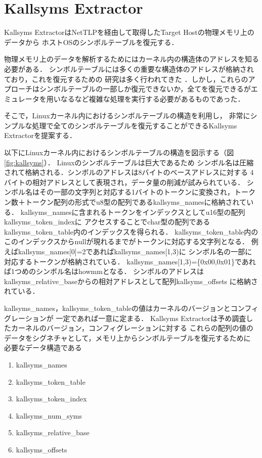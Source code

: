 \section{Kallsyms Extractor}


Kallsyms ExtractorはNetTLPを経由して取得したTarget Hostの物理メモリ上のデータから
ホストOSのシンボルテーブルを復元する．

物理メモリ上のデータを解析するためにはカーネル内の構造体のアドレスを知る必要がある．
シンボルテーブルには多くの重要な構造体のアドレスが格納されており，これを復元するための
研究は多く行われてきた\cite{ksfinder}\cite{volatility_android}
\cite{zhang2017research}\cite{autoprofile}．しかし，これらのアプローチはシンボルテーブルの一部しか復元できないか，全てを復元できるがエミュレータを用いなるなど複雑な処理を実行する必要があるものであった．

そこで，Linuxカーネル内におけるシンボルテーブルの構造を利用し，
非常にシンプルな処理で全てのシンボルテーブルを復元することができるKallsyms Extractorを提案する．

以下にLinuxカーネル内におけるシンボルテーブルの構造を図示する（図\ref{fig:kallsyms}）．
Linuxのシンボルテーブルは巨大であるため
シンボル名は圧縮されて格納される．シンボルのアドレスは8バイトのベースアドレスに対する
4バイトの相対アドレスとして表現され，データ量の削減が試みられている．
シンボル名はその一部の文字列と対応する1バイトのトークンに変換され，トークン数＋トークン配列の形式でu8型の配列であるkallsyms\_namesに格納されている．
kallsyms\_namesに含まれるトークンをインデックスとしてu16型の配列kallsyms\_token\_indexに
アクセスすることでchar型の配列であるkallsyms\_token\_table内のインデックスを得られる．
kallsyms\_token\_table内のこのインデックスからnullが現れるまでがトークンに対応する文字列となる．
例えばkallsyms\_names[0]=2であればkallsyms\_names[1,3)に
シンボル名の一部に対応するトークンが格納されている．
kallsyms\_names[1,3)=\{0x00,0x01\}であれば1つめのシンボル名はhowmmとなる．
シンボルのアドレスはkallsyms\_relative\_baseからの相対アドレスとして配列kallsyms\_offsets
に格納されている．

kallsyms\_names，kallsyms\_token\_tableの値はカーネルのバージョンとコンフィグレーションが
一定であれば一意に定まる．
Kallsyms Extractorは予め調査したカーネルのバージョン，コンフィグレーションに対する
これらの配列の値のデータをシグネチャとして，メモリ上からシンボルテーブルを復元するために
必要なデータ構造である

\begin{enumerate}
  \item kallsyms\_names
  \item kallsyms\_token\_table
  \item kallsyms\_token\_index
  \item kallsyms\_num\_syms
  \item kallsyms\_relative\_base
  \item kallsyms\_offsets
\end{enumerate}

